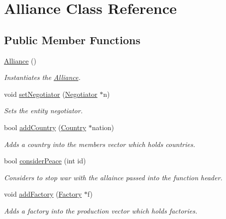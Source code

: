 \hypertarget{classAlliance}{}\section{Alliance Class Reference}
\label{classAlliance}
\subsection*{Public Member Functions}
\begin{DoxyCompactItemize}
\item 
\mbox{\label{classAlliance_a262a2819e969b465eb9548e419bad521}} 
\hyperlink{classAlliance_a262a2819e969b465eb9548e419bad521}{Alliance} ()
\begin{DoxyCompactList}\small\item\em Instantiates the \hyperlink{classAlliance}{Alliance}. \end{DoxyCompactList}\item 
void \hyperlink{classAlliance_a80f9a001ba5bad946690111b775c2349}{set\+Negotiator} (\hyperlink{classNegotiator}{Negotiator} $\ast$n)
\begin{DoxyCompactList}\small\item\em Sets the entity negotiator. \end{DoxyCompactList}\item 
bool \hyperlink{classAlliance_a7e5d92ca269e0d21b80978b0f72a2230}{add\+Country} (\hyperlink{classCountry}{Country} $\ast$nation)
\begin{DoxyCompactList}\small\item\em Adds a country into the members vector which holds countries. \end{DoxyCompactList}\item 
bool \hyperlink{classAlliance_acd8720fdba717c3e551a88ff6a1010b5}{consider\+Peace} (int id)
\begin{DoxyCompactList}\small\item\em Considers to stop war with the allaince passed into the function header. \end{DoxyCompactList}\item 
void \hyperlink{classAlliance_ab1ba99d78866c13e17031afa3bdd727e}{add\+Factory} (\hyperlink{classFactory}{Factory} $\ast$f)
\begin{DoxyCompactList}\small\item\em Adds a factory into the production vector which holds factories. \end{DoxyCompactList}\item 

\end{DoxyCompactItemize}
